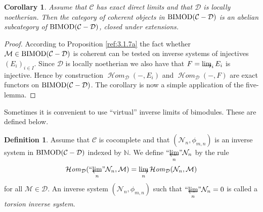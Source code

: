 \documentclass{amsproc}
\def \NN{{\mathbb N}}
\def\Cscr{{\mathcal C}}
\def\Dscr{{\mathcal D}}
\def\Hscr{{\mathcal H}}
\def\Mscr{{\mathcal M}}
\def\Nscr{{\mathcal N}}
\def\HHom{\operatorname {\Hscr \mathit{om}}}
\def\BIMOD{\mathop{\text{BIMOD}}}
\def\HHom{\operatorname {\Hscr \mathit{om}}}
\let\oldtext\text
\def\text#1{\oldtext{\upshape #1}}
\let\invlim\projlim
\newtheorem{corollarys}[lemmas]{Corollary}
\theoremstyle{definition}
\newtheorem{definitions}[lemmas]{Definition}
\theoremstyle{remark}
\def\dirlim{\mathop{\vtop{\baselineskip -100pt\lineskip -1pt\lineskiplimit 0pt
\setbox0\hbox{\upshape lim}\copy0\hbox to \wd0{\rightarrowfill}}}\limits}
\def\invlim{\mathop{\vtop{\baselineskip -100pt\lineskip -1pt\lineskiplimit 0pt
\setbox0\hbox{\upshape lim}\copy0\hbox to \wd0{\leftarrowfill}}}\limits}
\numberwithin{equation}{section}
\numberwithin{table}{section}
\numberwithin{figure}{section}
\begin{document}
\begin{corollarys}
\label{ref:3.1.8a}
Assume that $\Cscr$ has exact direct limits and that $\Dscr$ is
locally noetherian. Then the category of
coherent  objects in $\BIMOD(\Cscr-\Dscr)$ is an abelian subcategory of
$\BIMOD(\Cscr-\Dscr)$, closed under extensions.
\end{corollarys}
\begin{proof} According to Proposition \ref{ref:3.1.7a} the fact
  whether $\Mscr\in\BIMOD(\Cscr-\Dscr)$ is coherent can be tested on
  inverse systems of injectives $(E_i)_{i\in I}$. Since $\Dscr$ is
  locally noetherian we also have that $F=\dirlim\nolimits_i E_i$ is
  injective. Hence by construction $\HHom_\Dscr(-,E_i)$ and 
$\HHom_\Dscr(-,F)$ are exact functors on $\BIMOD(\Cscr-\Dscr)$. The
corollary is now a simple application of the five-lemma.
\end{proof}

\medskip

Sometimes it is convenient  to use ``virtual'' inverse limits of
bimodules. These are defined below.
\begin{definitions}
\label{ref:3.1.9a}
Assume that $\Cscr$ is cocomplete and that $(\Nscr_n,\phi_{m,n})$ is an inverse
system in $\BIMOD(\Cscr-\Dscr)$ indexed by $\NN$. We define
$``{\invlim_n}{}"\Nscr_n$ by the rule
\begin{equation}
\label{ref:3.2a}
\HHom_\Dscr(``{\invlim_n}{}"\Nscr_n,\Mscr)=\dirlim_n
\HHom_\Dscr(\Nscr_n,\Mscr)
\end{equation}
for all $\Mscr\in \Dscr$. 
An inverse system $(\Nscr_n,\phi_{m,n})$ such that
$``{\invlim_n}{}"\Nscr_n=0$ is called a \emph{torsion inverse system}.
\end{definitions}
\end{document}
